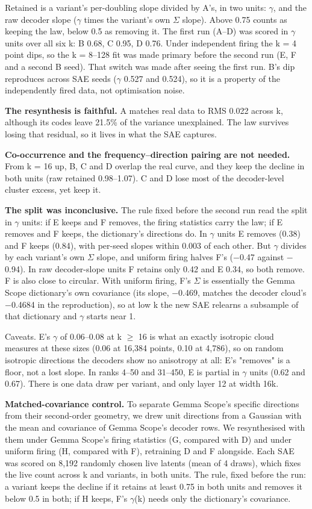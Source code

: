 \documentclass[11pt]{article}
\begin{document}
Retained is a variant's per-doubling slope divided by A's, in two units: $\gamma$, and the raw decoder slope ($\gamma$ times the variant's own $\Sigma$ slope). Above 0.75 counts as keeping the law, below 0.5 as removing it. The first run (A--D) was scored in $\gamma$ units over all six k: B 0.68, C 0.95, D 0.76. Under independent firing the k = 4 point dips, so the k = 8--128 fit was made primary before the second run (E, F and a second B seed). That switch was made after seeing the first run. B's dip reproduces across SAE seeds ($\gamma$ 0.527 and 0.524), so it is a property of the independently fired data, not optimisation noise.

\textbf{The resynthesis is faithful.} A matches real data to RMS 0.022 across k, although its codes leave 21.5\% of the variance unexplained. The law survives losing that residual, so it lives in what the SAE captures.

\textbf{Co-occurrence and the frequency--direction pairing are not needed.} From k = 16 up, B, C and D overlap the real curve, and they keep the decline in both units (raw retained 0.98--1.07). C and D lose most of the decoder-level cluster excess, yet keep it.

\textbf{The split was inconclusive.} The rule fixed before the second run read the split in $\gamma$ units: if E keeps and F removes, the firing statistics carry the law; if E removes and F keeps, the dictionary's directions do. In $\gamma$ units E removes (0.38) and F keeps (0.84), with per-seed slopes within 0.003 of each other. But $\gamma$ divides by each variant's own $\Sigma$ slope, and uniform firing halves F's ($-$0.47 against $-$0.94). In raw decoder-slope units F retains only 0.42 and E 0.34, so both remove. F is also close to circular. With uniform firing, F's $\Sigma$ is essentially the Gemma Scope dictionary's own covariance (its slope, $-$0.469, matches the decoder cloud's $-$0.4684 in the reproduction), so at low k the new SAE relearns a subsample of that dictionary and $\gamma$ starts near 1.

Caveats. E's $\gamma$ of 0.06--0.08 at k $\ge$ 16 is what an exactly isotropic cloud measures at these sizes (0.06 at 16,384 points, 0.10 at 4,786), so on random isotropic directions the decoders show no anisotropy at all: E's "removes" is a floor, not a lost slope. In ranks 4--50 and 31--450, E is partial in $\gamma$ units (0.62 and 0.67). There is one data draw per variant, and only layer 12 at width 16k.

\textbf{Matched-covariance control.} To separate Gemma Scope's specific directions from their second-order geometry, we drew unit directions from a Gaussian with the mean and covariance of Gemma Scope's decoder rows. We resynthesised with them under Gemma Scope's firing statistics (G, compared with D) and under uniform firing (H, compared with F), retraining D and F alongside. Each SAE was scored on 8,192 randomly chosen live latents (mean of 4 draws), which fixes the live count across k and variants, in both units. The rule, fixed before the run: a variant keeps the decline if it retains at least 0.75 in both units and removes it below 0.5 in both; if H keeps, F's $\gamma$(k) needs only the dictionary's covariance.
\end{document}
